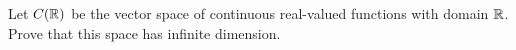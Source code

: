 \begin{exercise}
  \label{ex:hw03:continuous-functions-infinite-dimension}
  Let \(C(\mathbb{R})\) be the vector space of continuous real-valued functions
  with domain \(\mathbb{R}\). Prove that this space has infinite dimension.
\end{exercise}
